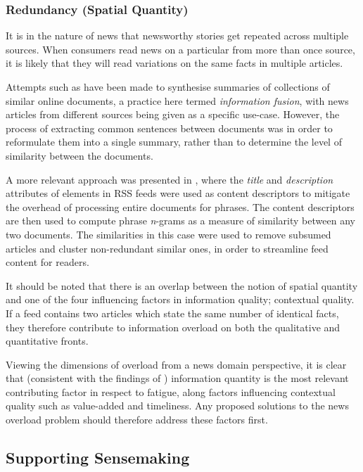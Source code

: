 \subsubsection{Redundancy (Spatial Quantity)}
It is in the nature of news that newsworthy stories get repeated across multiple sources. When consumers read news on a particular from more than once source, it is likely that they will read variations on the same facts in multiple articles.

Attempts such as \citep{InformationFusionInTheContextOfMultiDocumentSummarization} have been made to synthesise summaries of collections of similar online documents, a practice here termed \textit{information fusion}, with news articles from different sources being given as a specific use-case. However, the process of extracting common sentences between documents was in order to reformulate them into a single summary, rather than to determine the level of similarity between the documents.

A more relevant approach was presented in \citep{UtilizingPhraseSimilarityMeasures}, where the \textit{title} and \textit{description} attributes of elements in RSS feeds were used as content descriptors to mitigate the overhead of processing entire documents for phrases. The content descriptors are then used to compute phrase \textit{n}-grams as a measure of similarity between any two documents. The similarities in this case were used to remove subsumed articles and cluster non-redundant similar ones, in order to streamline feed content for readers.

It should be noted that there is an overlap between the notion of spatial quantity and one of the four influencing factors in information quality; contextual quality. If a feed contains two articles which state the same number of identical facts, they therefore contribute to information overload on both the qualitative and quantitative fronts.

Viewing the dimensions of overload from a news domain perspective, it is clear that (consistent with the findings of \citet{TowardsAnOptimalResolutionToInformationOverload}) information quantity is the most relevant contributing factor in respect to fatigue, along factors influencing contextual quality such as value-added and timeliness. Any proposed solutions to the news overload problem should therefore address these factors first.

\subsection{Supporting Sensemaking}

